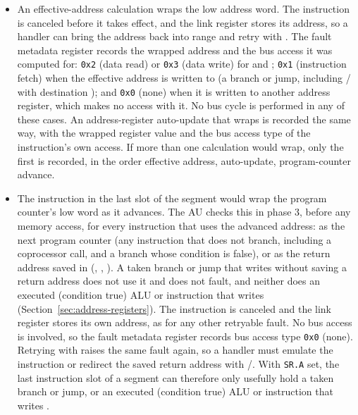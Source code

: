 \begin{itemize}
	\item An effective-address calculation wraps the low address word. The instruction is canceled before it takes effect, and
	      the link register stores its address, so a handler can bring the address back into range and retry with
	      . The fault metadata register records the wrapped address and the bus access it was computed for:
	      \texttt{0x2} (data read) or \texttt{0x3} (data write) for  and ; \texttt{0x1}
	      (instruction fetch) when the effective address is written to  (a branch or jump, including
	      / with destination ); and \texttt{0x0} (none) when it is written to another
	      address register, which makes no access with it. No bus cycle is performed in any of these cases. An address-register
	      auto-update that wraps is recorded the same way, with the wrapped register value and the bus access type of the
	      instruction's own access. If more than one calculation would wrap, only the first is recorded, in the order effective
	      address, auto-update, program-counter advance.
	\item The instruction in the last slot of the segment would wrap the program counter's low word as it advances. The AU checks
	      this in phase 3, before any memory access, for every instruction that uses the advanced address: as the next program
	      counter (any instruction that does not branch, including a coprocessor call, and a branch whose condition is false), or
	      as the return address saved in  (, , ). A taken branch or jump that
	      writes  without saving a return address does not use it and does not fault, and neither does an executed
	      (condition true) ALU or  instruction that writes  (Section~\ref{sec:address-registers}). The
	      instruction is canceled and the link register stores its own address, as for any other retryable fault. No bus access
	      is involved, so the fault metadata register records bus access type \texttt{0x0} (none). Retrying with 
	      raises the same fault again, so a handler must emulate the instruction or redirect the saved return address with
	      /. With \texttt{SR.A} set, the last instruction slot of a segment can therefore only
	      usefully hold a taken branch or jump, or an executed (condition true) ALU or  instruction that writes
	      .
\end{itemize}

